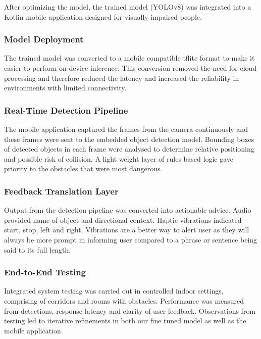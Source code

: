 \documentclass{FastFyp}
\begin{document}
After optimizing the model, the trained model (YOLOv8) was integrated into a Kotlin mobile application designed for visually impaired people.

\subsubsection{Model Deployment}

The trained model was converted to a mobile compatible tflite format to make it easier to perform on-device inference. This conversion removed the need for cloud processing and therefore reduced the latency and increased the reliability in environments with limited connectivity.

\subsubsection{Real-Time Detection Pipeline}

The mobile application captured the frames from the camera continuously and these frames were sent to the embedded object detection model. Bounding boxes of detected objects in each frame were analysed to determine relative positioning and possible risk of collision. A light weight layer of rules based logic gave priority to the obstacles that were most dangerous.

\subsubsection{Feedback Translation Layer}

Output from the detection pipeline was converted into actionable advice. Audio provided name of object and directional context. Haptic vibrations indicated start, stop, left and right. Vibrations are a better way to alert user as they will always be more prompt in informing user compared to a phrase or sentence being said to its full length. 


\subsubsection{End-to-End Testing}

Integrated system testing was carried out in controlled indoor settings, comprising of corridors and rooms with obstacles. Performance was measured from detections, response latency and clarity of user feedback. Observations from testing led to iterative refinements in both our fine tuned model as well as the mobile application. 
\end{document}
